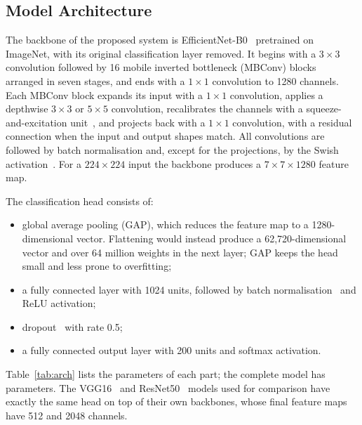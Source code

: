 \documentclass[conference]{IEEEtran}
\begin{document}
\subsection{Model Architecture}
The backbone of the proposed system is EfficientNet-B0~\cite{tan2019} pretrained
on ImageNet, with its original classification layer removed. It begins with a
$3\times3$ convolution followed by 16 mobile inverted bottleneck (MBConv)
blocks~\cite{sandler2018} arranged in seven stages, and ends with a $1\times1$
convolution to 1280 channels. Each MBConv block expands its input with a
$1\times1$ convolution, applies a depthwise $3\times3$ or $5\times5$ convolution,
recalibrates the channels with a squeeze-and-excitation unit~\cite{hu2018}, and
projects back with a $1\times1$ convolution, with a residual connection when the
input and output shapes match. All convolutions are followed by batch
normalisation and, except for the projections, by the Swish
activation~\cite{ramachandran2017}. For a $224\times224$ input the backbone
produces a $7\times7\times1280$ feature map.

The classification head consists of:
\begin{itemize}
\item global average pooling (GAP), which reduces the feature map to a
1280-dimensional vector. Flattening would instead produce a 62,720-dimensional
vector and over 64 million weights in the next layer; GAP keeps the head small
and less prone to overfitting;
\item a fully connected layer with 1024 units, followed by batch
normalisation~\cite{ioffe2015} and ReLU activation;
\item dropout~\cite{srivastava2014} with rate 0.5;
\item a fully connected output layer with 200 units and softmax activation.
\end{itemize}
Table~\ref{tab:arch} lists the parameters of each part; the complete model has
\EffNetParams{} parameters. The VGG16~\cite{simonyan2015} and
ResNet50~\cite{he2016} models used for comparison have exactly the same head on
top of their own backbones, whose final feature maps have 512 and 2048 channels.
\end{document}
